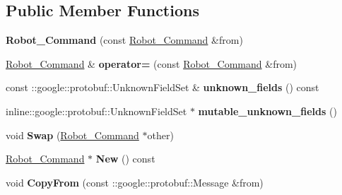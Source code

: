 \subsection*{Public Member Functions}
\begin{DoxyCompactItemize}
\item 
{\bfseries Robot\+\_\+\+Command} (const \hyperlink{classvss__command_1_1Robot__Command}{Robot\+\_\+\+Command} \&from)\hypertarget{classvss__command_1_1Robot__Command_aec1028695262ac9887a661768f2f8bb1}{}\label{classvss__command_1_1Robot__Command_aec1028695262ac9887a661768f2f8bb1}

\item 
\hyperlink{classvss__command_1_1Robot__Command}{Robot\+\_\+\+Command} \& {\bfseries operator=} (const \hyperlink{classvss__command_1_1Robot__Command}{Robot\+\_\+\+Command} \&from)\hypertarget{classvss__command_1_1Robot__Command_afebc3c2ee761027356ce0fabe568ae11}{}\label{classvss__command_1_1Robot__Command_afebc3c2ee761027356ce0fabe568ae11}

\item 
const \+::google\+::protobuf\+::\+Unknown\+Field\+Set \& {\bfseries unknown\+\_\+fields} () const \hypertarget{classvss__command_1_1Robot__Command_a9df4b6bca5721e6b1ae945dc975af2c6}{}\label{classvss__command_1_1Robot__Command_a9df4b6bca5721e6b1ae945dc975af2c6}

\item 
inline\+::google\+::protobuf\+::\+Unknown\+Field\+Set $\ast$ {\bfseries mutable\+\_\+unknown\+\_\+fields} ()\hypertarget{classvss__command_1_1Robot__Command_ac59c88c8dcf9b0e1128e845e238a92d4}{}\label{classvss__command_1_1Robot__Command_ac59c88c8dcf9b0e1128e845e238a92d4}

\item 
void {\bfseries Swap} (\hyperlink{classvss__command_1_1Robot__Command}{Robot\+\_\+\+Command} $\ast$other)\hypertarget{classvss__command_1_1Robot__Command_aab4cd2f4e6d3316f414fa32e7ccf1660}{}\label{classvss__command_1_1Robot__Command_aab4cd2f4e6d3316f414fa32e7ccf1660}

\item 
\hyperlink{classvss__command_1_1Robot__Command}{Robot\+\_\+\+Command} $\ast$ {\bfseries New} () const \hypertarget{classvss__command_1_1Robot__Command_a16862f509cc6ad30afa51daa6f18ab73}{}\label{classvss__command_1_1Robot__Command_a16862f509cc6ad30afa51daa6f18ab73}

\item 
void {\bfseries Copy\+From} (const \+::google\+::protobuf\+::\+Message \&from)\hypertarget{classvss__command_1_1Robot__Command_a44b1cba95f68eb9c9349d1f06b0567db}{}\label{classvss__command_1_1Robot__Command_a44b1cba95f68eb9c9349d1f06b0567db}


\end{DoxyCompactItemize}

